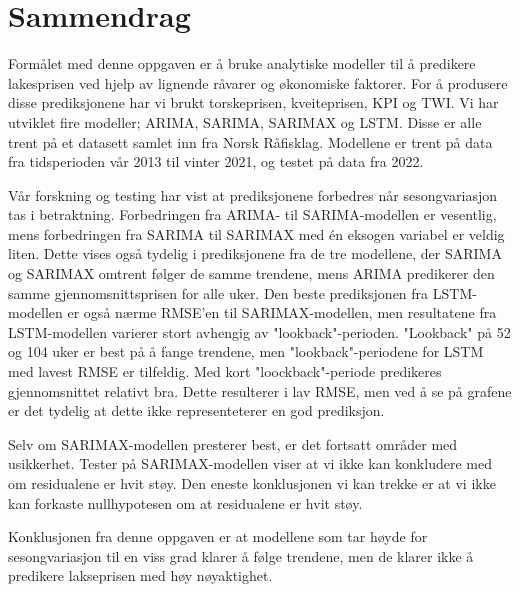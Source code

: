 \section*{Sammendrag}
Formålet med denne oppgaven er å bruke analytiske modeller til å predikere lakesprisen ved hjelp av lignende råvarer og økonomiske faktorer. For å produsere disse prediksjonene har vi brukt torskeprisen, kveiteprisen, KPI og TWI. Vi har utviklet fire modeller; ARIMA, SARIMA, SARIMAX og LSTM. Disse er alle trent på et datasett samlet inn fra Norsk Råfisklag. Modellene er trent på data fra tidsperioden vår 2013 til vinter 2021, og testet på data fra 2022.

Vår forskning og testing har vist at prediksjonene forbedres når sesongvariasjon tas i betraktning. Forbedringen fra ARIMA- til SARIMA-modellen er vesentlig, mens forbedringen fra SARIMA til SARIMAX med én eksogen variabel er veldig liten. Dette vises også tydelig i prediksjonene fra de tre modellene, der SARIMA og SARIMAX omtrent følger de samme trendene, mens ARIMA predikerer den samme gjennomsnittsprisen for alle uker. Den beste prediksjonen fra LSTM-modellen er også nærme RMSE'en til SARIMAX-modellen, men resultatene fra LSTM-modellen varierer stort avhengig av "lookback"-perioden. "Lookback" på 52 og 104 uker er best på å fange trendene, men "lookback"-periodene for LSTM med lavest RMSE er tilfeldig. Med kort "loockback"-periode predikeres gjennomsnittet relativt bra. Dette resulterer i lav RMSE, men ved å se på grafene er det tydelig at dette ikke representeterer en god prediksjon. 

Selv om SARIMAX-modellen presterer best, er det fortsatt områder med usikkerhet. Tester på SARIMAX-modellen viser at vi ikke kan konkludere med om residualene er hvit støy. Den eneste konklusjonen vi kan trekke er at vi ikke kan forkaste nullhypotesen om at residualene er hvit støy.

Konklusjonen fra denne oppgaven er at modellene som tar høyde for sesongvariasjon til en viss grad klarer å følge trendene, men de klarer ikke å predikere lakseprisen med høy nøyaktighet. 

